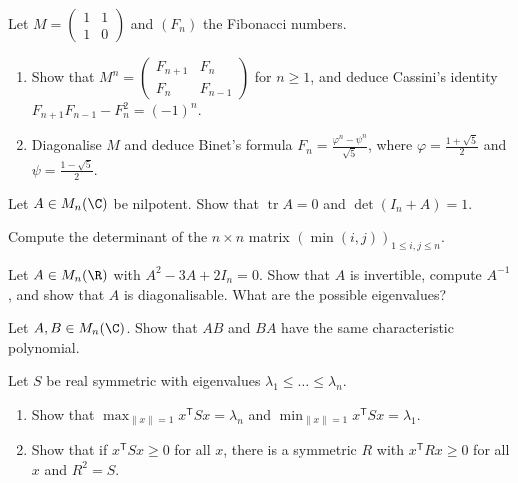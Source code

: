 \begin{exercise}[$\star$]\label{ex:fibmat}
Let $M=\begin{pmatrix}1&1\\1&0\end{pmatrix}$ and $(F_n)$ the Fibonacci numbers.
\begin{enumerate}[label=(\alph*)]
\item Show that $M^n=\begin{pmatrix}F_{n+1}&F_n\\F_n&F_{n-1}\end{pmatrix}$ for $n\ge1$, and deduce Cassini's identity $F_{n+1}F_{n-1}-F_n^2=(-1)^n$.
\item Diagonalise $M$ and deduce Binet's formula $F_n=\frac{\varphi^n-\psi^n}{\sqrt5}$, where $\varphi=\frac{1+\sqrt5}2$ and $\psi=\frac{1-\sqrt5}2$.
\end{enumerate}
\end{exercise}

\begin{exercise}[$\star$]\label{ex:nilp}
Let $A\in M_n(\C)$ be nilpotent. Show that $\operatorname{tr}A=0$ and $\det(I_n+A)=1$.
\end{exercise}

\begin{exercise}[$\star$]\label{ex:mindet}
Compute the determinant of the $n\times n$ matrix $\left(\min(i,j)\right)_{1\le i,j\le n}$.
\end{exercise}

\begin{exercise}[$\star\star$]\label{ex:annul}
Let $A\in M_n(\R)$ with $A^2-3A+2I_n=0$. Show that $A$ is invertible, compute $A^{-1}$, and show that $A$ is diagonalisable. What are the possible eigenvalues?
\end{exercise}

\begin{exercise}[$\star\star$]\label{ex:abba}
Let $A,B\in M_n(\C)$. Show that $AB$ and $BA$ have the same characteristic polynomial.
\end{exercise}

\begin{exercise}[$\star\star$]\label{ex:rayleigh}
Let $S$ be real symmetric with eigenvalues $\lambda_1\le\dots\le\lambda_n$.
\begin{enumerate}[label=(\alph*)]
\item Show that $\max_{\|x\|=1}x^{\mathsf T}Sx=\lambda_n$ and $\min_{\|x\|=1}x^{\mathsf T}Sx=\lambda_1$.
\item Show that if $x^{\mathsf T}Sx\ge0$ for all $x$, there is a symmetric $R$ with $x^{\mathsf T}Rx\ge0$ for all $x$ and $R^2=S$.
\end{enumerate}
\end{exercise}

